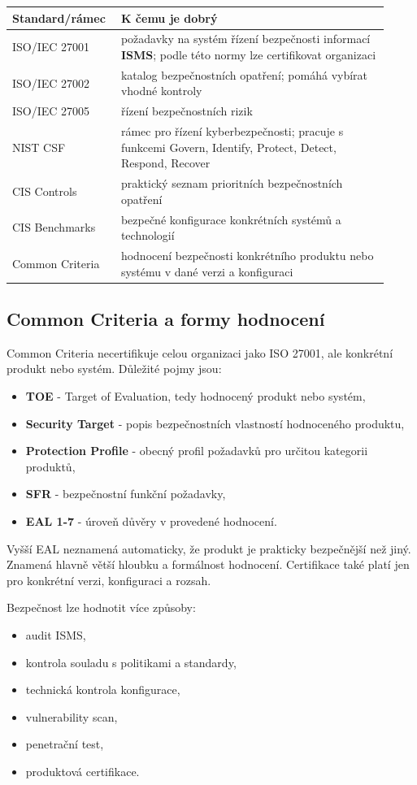 \begin{longtable}{p{0.24\linewidth}p{0.68\linewidth}}
\toprule
\textbf{Standard/rámec} & \textbf{K čemu je dobrý} \\
\midrule\endhead
ISO/IEC 27001 & požadavky na systém řízení bezpečnosti informací \textbf{ISMS}; podle této normy lze certifikovat organizaci \\
ISO/IEC 27002 & katalog bezpečnostních opatření; pomáhá vybírat vhodné kontroly \\
ISO/IEC 27005 & řízení bezpečnostních rizik \\
NIST CSF & rámec pro řízení kyberbezpečnosti; pracuje s funkcemi Govern, Identify, Protect, Detect, Respond, Recover \\
CIS Controls & praktický seznam prioritních bezpečnostních opatření \\
CIS Benchmarks & bezpečné konfigurace konkrétních systémů a technologií \\
Common Criteria & hodnocení bezpečnosti konkrétního produktu nebo systému v dané verzi a konfiguraci \\
\bottomrule
\end{longtable}

\subsection*{Common Criteria a formy hodnocení}

Common Criteria necertifikuje celou organizaci jako ISO 27001, ale konkrétní produkt nebo systém. Důležité pojmy jsou:
\begin{itemize}
    \item \textbf{TOE} - Target of Evaluation, tedy hodnocený produkt nebo systém,
    \item \textbf{Security Target} - popis bezpečnostních vlastností hodnoceného produktu,
    \item \textbf{Protection Profile} - obecný profil požadavků pro určitou kategorii produktů,
    \item \textbf{SFR} - bezpečnostní funkční požadavky,
    \item \textbf{EAL 1-7} - úroveň důvěry v provedené hodnocení.
\end{itemize}

Vyšší EAL neznamená automaticky, že produkt je prakticky bezpečnější než jiný. Znamená hlavně větší hloubku a formálnost hodnocení. Certifikace také platí jen pro konkrétní verzi, konfiguraci a rozsah.

Bezpečnost lze hodnotit více způsoby:
\begin{itemize}
    \item audit ISMS,
    \item kontrola souladu s politikami a standardy,
    \item technická kontrola konfigurace,
    \item vulnerability scan,
    \item penetrační test,
    \item produktová certifikace.
\end{itemize}

